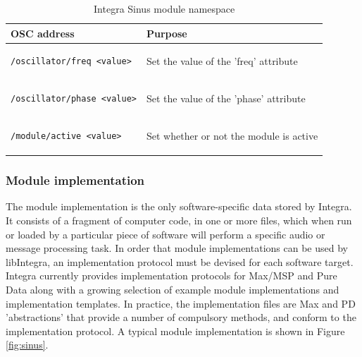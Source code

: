 \documentclass{article}
\begin{document}
\begin{table}
\begin{center}
\begin{tabular}{|p{13em}|p{8em}|}
\hline
\textbf{OSC address} & \textbf{Purpose} \\
\hline
\begin{minipage}[0pt]{10em}
\small {
\begin{verbatim}/oscillator/freq <value>\end{verbatim}}\end{minipage}  & \small{Set the value of the 'freq' attribute} \\
\hline
\begin{minipage}[0pt]{10em}
\small{
\begin{verbatim}/oscillator/phase <value>\end{verbatim}}\end{minipage}  & \small{Set the value of the 'phase' attribute} \\
\hline
\begin{minipage}[0pt]{10em}
\small{
\begin{verbatim}/module/active <value>
\end{verbatim}} \end{minipage} & \small{Set whether or not the module is active} \\
\hline
\end{tabular} 
\end{center}
\caption{Integra Sinus module namespace}
\label{tab:module_namespace}
\end{table}

\subsubsection{Module implementation}\label{subsubsec:module_implementation}

The module implementation is the only software-specific data stored by Integra. It consists of a fragment of computer code, in one or more files, which when run or loaded by a particular piece of software will perform a specific audio or message processing task. In order that module implementations can be used by libIntegra, an implementation protocol must be devised for each software target. Integra currently provides implementation protocols for Max/MSP and Pure Data along with a growing selection of example module implementations and implementation templates. In practice, the implementation files are Max and PD 'abstractions' that provide a number of compulsory methods, and conform to the implementation protocol. A typical module implementation is shown in Figure {\ref{fig:sinus}}. 
\end{document}
